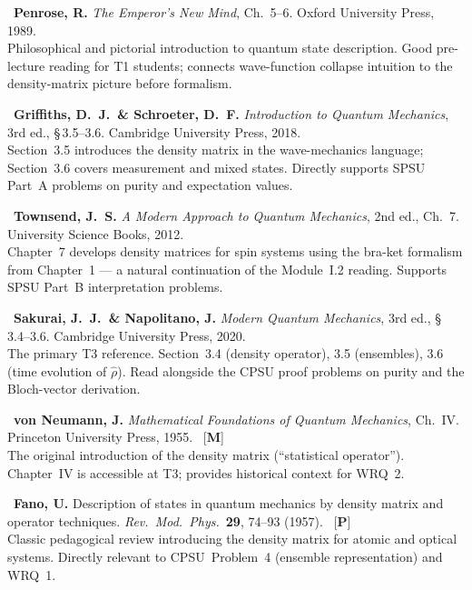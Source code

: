 \documentclass[11pt,a4paper]{article}
\begin{document}
\bigskip
\begin{enumerate}[leftmargin=2em,label={\textbf{[\arabic*]}},itemsep=6pt]

  \item {}\
    \textbf{Penrose, R.}
    \textit{The Emperor's New Mind}, Ch.~5--6.
    Oxford University Press, 1989. \useful\\
    Philosophical and pictorial introduction to quantum state description.
    Good pre-lecture reading for T1 students; connects wave-function
    collapse intuition to the density-matrix picture before formalism.

  \item {}\
    \textbf{Griffiths, D.~J.\ \& Schroeter, D.~F.}
    \textit{Introduction to Quantum Mechanics}, 3rd ed., \S\,3.5--3.6.
    Cambridge University Press, 2018. \essential\\
    Section~3.5 introduces the density matrix in the wave-mechanics language;
    Section~3.6 covers measurement and mixed states. Directly supports
    SPSU Part~A problems on purity and expectation values.

  \item {}\
    \textbf{Townsend, J.~S.}
    \textit{A Modern Approach to Quantum Mechanics}, 2nd ed., Ch.~7.
    University Science Books, 2012. \recommended\\
    Chapter~7 develops density matrices for spin systems using
    the bra-ket formalism from Chapter~1 --- a natural continuation
    of the Module~I.2 reading. Supports SPSU Part~B interpretation problems.

  \item \tiertag{tier3col}{T3}\
    \textbf{Sakurai, J.~J.\ \& Napolitano, J.}
    \textit{Modern Quantum Mechanics}, 3rd ed., \S\,3.4--3.6.
    Cambridge University Press, 2020. \essential\\
    The primary T3 reference. Section~3.4 (density operator), 3.5
    (ensembles), 3.6 (time evolution of $\hat{\rho}$). Read alongside
    the CPSU proof problems on purity and the Bloch-vector derivation.

  \item {}\
    \textbf{von Neumann, J.}
    \textit{Mathematical Foundations of Quantum Mechanics}, Ch.~IV.
    Princeton University Press, 1955. \recommended\ [\textbf{M}]\\
    The original introduction of the density matrix (``statistical operator'').
    Chapter~IV is accessible at T3; provides historical context for WRQ~2.

  \item \tiertag{tier3col}{T3}\
    \textbf{Fano, U.}
    Description of states in quantum mechanics by density matrix and operator techniques.
    \textit{Rev.~Mod.~Phys.}~\textbf{29}, 74--93 (1957). \recommended\ [\textbf{P}]\\
    Classic pedagogical review introducing the density matrix for atomic
    and optical systems. Directly relevant to CPSU~Problem~4 (ensemble
    representation) and WRQ~1.

\end{enumerate}
\end{document}
